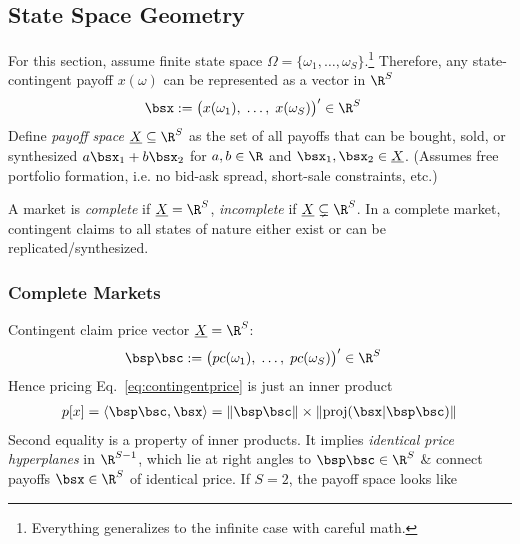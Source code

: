 \documentclass[12pt]{article}
\theoremstyle{plain}
\theoremstyle{definition}
\theoremstyle{remark}
\newcommand{\proj}{\operatorname{proj}}
\begin{document}
\begin{multicols*}{2}
\clearpage
\subsection{State Space Geometry}

For this section, assume finite state space
$\Omega=\{\omega_1,\ldots,\omega_S\}$.\footnote{%
  Everything generalizes to the infinite case with careful math.
}
Therefore, any state-contingent payoff $x(\omega)$ can be represented as
a vector in $\R^S$
\begin{align*}
  \bsx
  &:= \big(x(\omega_1),\; \ldots,\; x(\omega_S)\big)'
  \in\R^S
\end{align*}
Define \emph{payoff space} $\underline{X}\subseteq \R^S$ as the set of
all payoffs that can be bought, sold, or synthesized
$a\bsx_1 + b\bsx_2$ for $a,b\in\R$ and $\bsx_1,\bsx_2\in\underline{X}$.
(Assumes free portfolio formation, i.e. no bid-ask
spread, short-sale constraints, etc.)

A market is \emph{complete} if $\underline{X}=\R^S$, \emph{incomplete}
if $\underline{X}\subsetneq\R^S$. In a complete market, contingent
claims to all states of nature either exist or can be
replicated/synthesized.

\subsubsection{Complete Markets}

Contingent claim price vector $\underline{X}=\R^S$:
\begin{align*}
  \bsp\bsc
  &:= \big(pc(\omega_1),\; \ldots,\; pc(\omega_S)\big)'
  \in\R^S
\end{align*}
Hence pricing Eq.~\ref{eq:contingentprice} is just an inner product
\begin{align}
  p[x]=\langle \bsp\bsc, \bsx\rangle
  = \lVert \bsp\bsc\rVert \times \lVert \proj(\bsx|\bsp\bsc)\rVert
  \label{vectorprice}
\end{align}
Second equality is a property of inner products. It implies
\emph{identical price hyperplanes} in $\R^{S-1}$, which lie at right
angles to $\bsp\bsc\in\R^S$ \& connect payoffs $\bsx\in\R^S$ of
identical price.
If $S=2$, the payoff space looks like
\vspace{10pt}

\end{multicols*}
\end{document}
